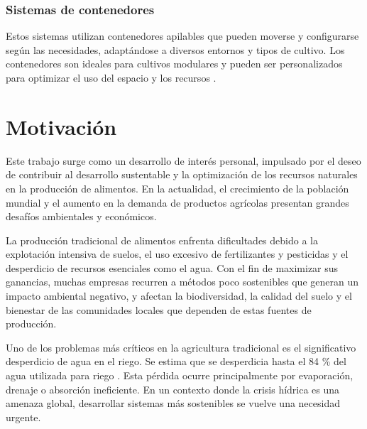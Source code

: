 \subsubsection{Sistemas de contenedores}
Estos sistemas utilizan contenedores apilables que pueden moverse y configurarse según las necesidades, adaptándose a diversos entornos y tipos de cultivo.
Los contenedores son ideales para cultivos modulares y pueden ser personalizados para optimizar el uso del espacio y los recursos \cite{CULTIVOS:TIPOS}.



\section{Motivación}

Este trabajo surge como un desarrollo de interés personal, impulsado por el deseo de contribuir al desarrollo sustentable y la optimización de los recursos naturales en la producción de alimentos. En la actualidad, el crecimiento de la población mundial y el aumento en la demanda de productos agrícolas presentan grandes desafíos ambientales y económicos.

La producción tradicional de alimentos enfrenta dificultades debido a la explotación intensiva de suelos, el uso excesivo de fertilizantes y pesticidas y el desperdicio de recursos esenciales como el agua. Con el fin de maximizar sus ganancias, muchas empresas recurren a métodos poco sostenibles que generan un impacto ambiental negativo, y afectan la biodiversidad, la calidad del suelo y el bienestar de las comunidades locales que dependen de estas fuentes de producción.

Uno de los problemas más críticos en la agricultura tradicional es el significativo desperdicio de agua en el riego. Se estima que se desperdicia hasta el 84 \% del agua utilizada para riego \cite{CLARIN}. Esta pérdida ocurre principalmente por evaporación, drenaje o absorción ineficiente. En un contexto donde la crisis hídrica es una amenaza global, desarrollar sistemas más sostenibles se vuelve una necesidad urgente.

